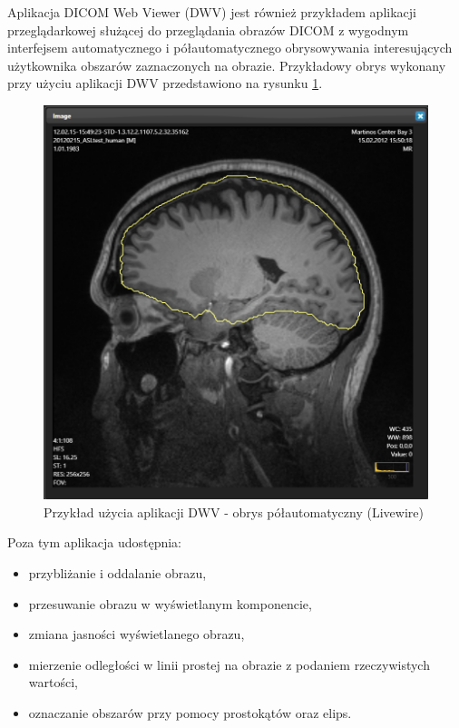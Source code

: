 \documentclass[a4paper,11pt,twoside,openright]{report}
\theoremstyle{definition}
\begin{document}
Aplikacja DICOM Web Viewer (DWV) \cite{DWV} jest również przykładem aplikacji przeglądarkowej służącej do przeglądania obrazów DICOM z wygodnym interfejsem automatycznego i półautomatycznego obrysowywania interesujących użytkownika obszarów zaznaczonych na obrazie. Przykładowy obrys wykonany przy użyciu aplikacji DWV przedstawiono na rysunku \ref{fig:DWV-interface}.

\begin{figure}[h]
	\includegraphics[width=\textwidth]{DWV-interface}
	\caption{Przykład użycia aplikacji DWV - obrys półautomatyczny (Livewire)}
    	\label{fig:DWV-interface}
\end{figure}

 Poza tym aplikacja udostępnia:
\begin{itemize}[noitemsep]
\item przybliżanie i oddalanie obrazu,
\item przesuwanie obrazu w wyświetlanym komponencie,
\item zmiana jasności wyświetlanego obrazu,
\item mierzenie odległości w linii prostej na obrazie z podaniem rzeczywistych wartości,
\item oznaczanie obszarów przy pomocy prostokątów oraz elips.
\end{itemize}
\end{document}
